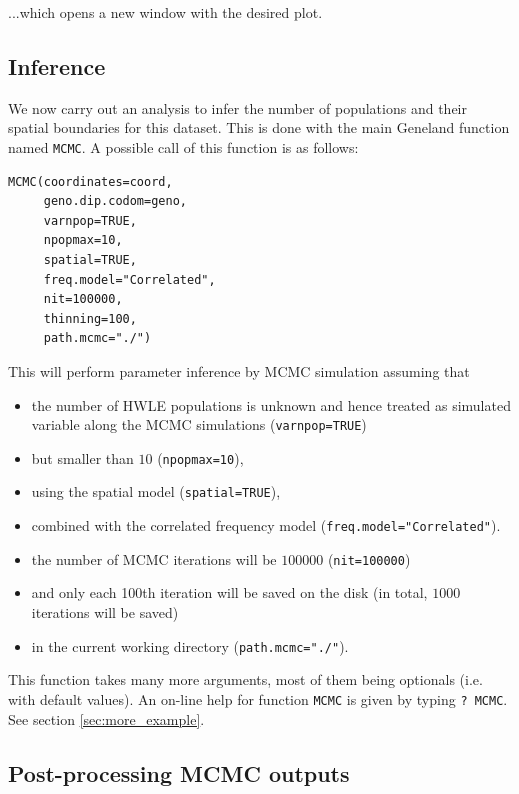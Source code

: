 \documentclass[a4paper,10pt]{article}
\begin{document}
...which opens a new window with the desired plot.


\subsection{Inference}\label{sec:example_MCMC}

We now carry out an analysis to infer the number of populations and their spatial boundaries for this dataset.
This is done with the main {\sc Geneland} function named {\tt MCMC}. 
A possible call of this function is as follows:

\begin{verbatim}
MCMC(coordinates=coord,
     geno.dip.codom=geno,
     varnpop=TRUE, 
     npopmax=10,
     spatial=TRUE,
     freq.model="Correlated",
     nit=100000,
     thinning=100,
     path.mcmc="./")
\end{verbatim}



This will perform parameter inference by MCMC simulation assuming 
that 
\begin{itemize}
\item the number of HWLE populations is unknown and hence treated as simulated 
variable along the MCMC simulations (\texttt{varnpop=TRUE}) 
\item but smaller than $10$ (\texttt{npopmax=10}), 
\item using the spatial model (\texttt{spatial=TRUE}), 
\item combined with 
the correlated frequency model (\texttt{freq.model="Correlated"}). 
\item the number of MCMC iterations will be $100000$ (\texttt{nit=100000}) 
\item and only each 100th iteration will be saved on the disk (in total, $1000$ iterations will be saved)
\item in the current working directory (\texttt{path.mcmc="./"}).
\end{itemize}


 
This function takes many more arguments, most of them being optionals (i.e. with default values).
An on-line help for function \texttt{MCMC} is given by typing \texttt{? MCMC}. See section \ref{sec:more_example}.


\subsection{Post-processing MCMC outputs}
\end{document}
